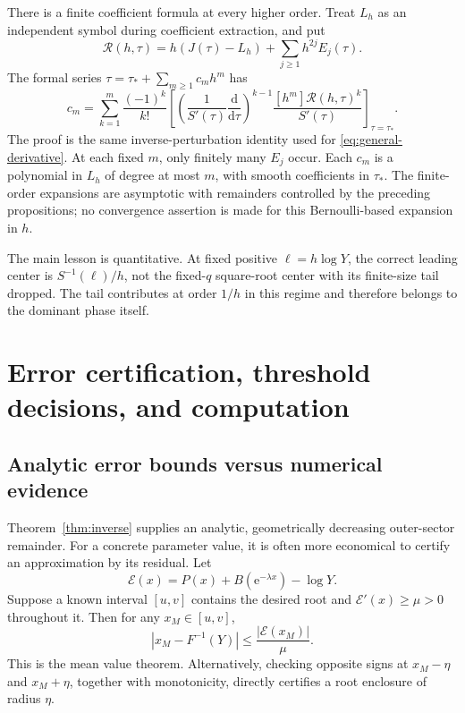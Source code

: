\documentclass[11pt]{article}
\numberwithin{equation}{section}
\theoremstyle{definition}
\newcommand{\ee}{\mathrm e}
\newcommand{\dd}{\mathrm d}
\begin{document}
There is a finite coefficient formula at every higher order. Treat $L_h$ as an independent symbol during coefficient extraction, and put
\begin{equation}\label{eq:crossoverR}
 \mathcal R(h,\tau)=h(J(\tau)-L_h)
                  +\sum_{j\ge1}h^{2j}E_j(\tau).
\end{equation}
The formal series $\tau=\tau_*+\sum_{m\ge1}c_mh^m$ has
\begin{equation}\label{eq:crossover-all}
 c_m=\sum_{k=1}^m\frac{(-1)^k}{k!}
 \left[
 \left(\frac1{S'(\tau)}\frac{\dd}{\dd\tau}\right)^{k-1}
 \frac{[h^m]\mathcal R(h,\tau)^k}{S'(\tau)}
 \right]_{\tau=\tau_*}.
\end{equation}
The proof is the same inverse-perturbation identity used for
\eqref{eq:general-derivative}. At each fixed $m$, only finitely many $E_j$ occur. Each $c_m$ is a polynomial in $L_h$ of degree at most $m$, with smooth coefficients in $\tau_*$. The finite-order expansions are asymptotic with remainders controlled by the preceding propositions; no convergence assertion is made for this Bernoulli-based expansion in $h$.

The main lesson is quantitative. At fixed positive $\ell=h\log Y$, the correct leading center is $S^{-1}(\ell)/h$, not the fixed-$q$ square-root center with its finite-size tail dropped. The tail contributes at order $1/h$ in this regime and therefore belongs to the dominant phase itself.

\section{Error certification, threshold decisions, and computation}
\label{sec:certification}

\subsection{Analytic error bounds versus numerical evidence}

Theorem~\ref{thm:inverse} supplies an analytic, geometrically decreasing outer-sector remainder. For a concrete parameter value, it is often more economical to certify an approximation by its residual. Let
\begin{equation}\label{eq:residual}
 \mathcal E(x)=P(x)+B(\ee^{-\lambda x})-\log Y.
\end{equation}
Suppose a known interval $[u,v]$ contains the desired root and
$\mathcal E'(x)\ge\mu>0$ throughout it. Then for any $x_M\in[u,v]$,
\begin{equation}\label{eq:residualbound}
 |x_M-F^{-1}(Y)|\le\frac{|\mathcal E(x_M)|}{\mu}.
\end{equation}
This is the mean value theorem. Alternatively, checking opposite signs at
$x_M-\eta$ and $x_M+\eta$, together with monotonicity, directly certifies a root enclosure of radius $\eta$.
\end{document}
